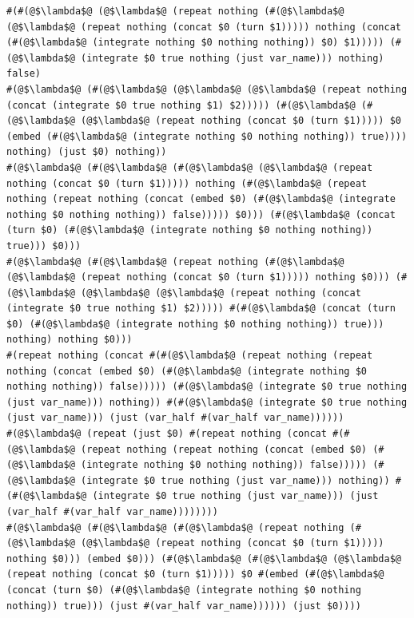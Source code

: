 \documentclass{article}
\begin{document}
\begin{lstlisting}
#(#(@$\lambda$@ (@$\lambda$@ (repeat nothing (#(@$\lambda$@ (@$\lambda$@ (repeat nothing (concat $0 (turn $1))))) nothing (concat (#(@$\lambda$@ (integrate nothing $0 nothing nothing)) $0) $1))))) (#(@$\lambda$@ (integrate $0 true nothing (just var_name))) nothing) false)
#(@$\lambda$@ (#(@$\lambda$@ (@$\lambda$@ (@$\lambda$@ (repeat nothing (concat (integrate $0 true nothing $1) $2))))) (#(@$\lambda$@ (#(@$\lambda$@ (@$\lambda$@ (repeat nothing (concat $0 (turn $1))))) $0 (embed (#(@$\lambda$@ (integrate nothing $0 nothing nothing)) true)))) nothing) (just $0) nothing))
#(@$\lambda$@ (#(@$\lambda$@ (#(@$\lambda$@ (@$\lambda$@ (repeat nothing (concat $0 (turn $1))))) nothing (#(@$\lambda$@ (repeat nothing (repeat nothing (concat (embed $0) (#(@$\lambda$@ (integrate nothing $0 nothing nothing)) false))))) $0))) (#(@$\lambda$@ (concat (turn $0) (#(@$\lambda$@ (integrate nothing $0 nothing nothing)) true))) $0)))
#(@$\lambda$@ (#(@$\lambda$@ (repeat nothing (#(@$\lambda$@ (@$\lambda$@ (repeat nothing (concat $0 (turn $1))))) nothing $0))) (#(@$\lambda$@ (@$\lambda$@ (@$\lambda$@ (repeat nothing (concat (integrate $0 true nothing $1) $2))))) #(#(@$\lambda$@ (concat (turn $0) (#(@$\lambda$@ (integrate nothing $0 nothing nothing)) true))) nothing) nothing $0)))
#(repeat nothing (concat #(#(@$\lambda$@ (repeat nothing (repeat nothing (concat (embed $0) (#(@$\lambda$@ (integrate nothing $0 nothing nothing)) false))))) (#(@$\lambda$@ (integrate $0 true nothing (just var_name))) nothing)) #(#(@$\lambda$@ (integrate $0 true nothing (just var_name))) (just (var_half #(var_half var_name))))))
#(@$\lambda$@ (repeat (just $0) #(repeat nothing (concat #(#(@$\lambda$@ (repeat nothing (repeat nothing (concat (embed $0) (#(@$\lambda$@ (integrate nothing $0 nothing nothing)) false))))) (#(@$\lambda$@ (integrate $0 true nothing (just var_name))) nothing)) #(#(@$\lambda$@ (integrate $0 true nothing (just var_name))) (just (var_half #(var_half var_name))))))))
#(@$\lambda$@ (#(@$\lambda$@ (#(@$\lambda$@ (repeat nothing (#(@$\lambda$@ (@$\lambda$@ (repeat nothing (concat $0 (turn $1))))) nothing $0))) (embed $0))) (#(@$\lambda$@ (#(@$\lambda$@ (@$\lambda$@ (repeat nothing (concat $0 (turn $1))))) $0 #(embed (#(@$\lambda$@ (concat (turn $0) (#(@$\lambda$@ (integrate nothing $0 nothing nothing)) true))) (just #(var_half var_name)))))) (just $0))))
\end{lstlisting}



\end{document}

